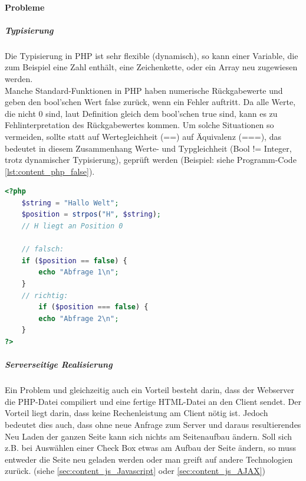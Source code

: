 \paragraph{Probleme}
\subparagraph{Typisierung} 
Die Typisierung in PHP ist sehr flexible (dynamisch), so kann einer Variable, die zum Beispiel eine Zahl enthält, eine Zeichenkette, oder ein Array neu zugewiesen werden.\\
Manche Standard-Funktionen in PHP haben numerische Rückgabewerte und geben den bool'schen Wert false zurück, wenn ein Fehler auftritt. Da alle Werte, die nicht 0 sind, laut Definition gleich dem bool'schen true sind, kann es zu Fehlinterpretation des Rückgabewertes kommen. Um solche Situationen so vermeiden, sollte statt auf Wertegleichheit (==) auf Äquivalenz (===), das bedeutet in diesem Zusammenhang Werte- und Typgleichheit (Bool != Integer, trotz dynamischer Typisierung), geprüft werden (Beispiel: siehe Programm-Code \ref{lst:content_php_false}).
\begin{lstlisting}[style=custom, language=PHP,  caption={false},label={lst:content_php_false}]
<?php 
	$string = "Hallo Welt";
	$position = strpos("H", $string); 
	// H liegt an Position 0
	
	// falsch:
	if ($position == false) {
		echo "Abfrage 1\n";
	}
	// richtig:
		if ($position === false) {
		echo "Abfrage 2\n";
	}
?>
\end{lstlisting}
\subparagraph{Serverseitige Realisierung}
Ein Problem und gleichzeitig auch ein Vorteil besteht darin, dass der Webserver die PHP-Datei compiliert und eine fertige HTML-Datei an den Client sendet. Der Vorteil liegt darin, dass keine Rechenleistung am Client nötig ist. Jedoch bedeutet dies auch, dass ohne neue Anfrage zum Server und daraus resultierendes Neu Laden der ganzen Seite kann sich nichts am Seitenaufbau ändern. Soll sich z.B. bei Auswählen einer Check Box etwas am Aufbau der Seite ändern, so muss entweder die Seite neu geladen werden oder man greift auf andere Technologien zurück. (siehe \ref{sec:content_js_Javascript} oder \ref{sec:content_js_AJAX})
